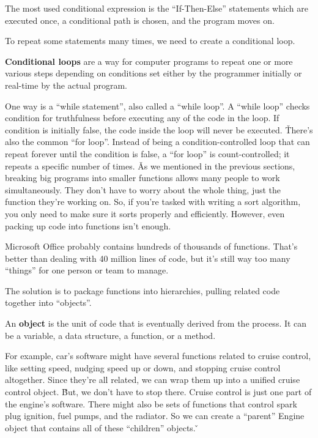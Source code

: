 The most used conditional expression is the ``If-Then-Else'' statements which are executed once, a conditional path
is chosen, and the program moves on.


To repeat some statements many times, we need to create a conditional loop.

\textbf{Conditional loops} are a way for computer programs to repeat one or more various steps depending on
conditions set either by the programmer initially or real-time by the actual program.
\ed

One way is a ``while statement'', also called a ``while loop''. A ``while loop'' checks condition for truthfulness
before executing any of the code in the loop. If condition is initially false, the code inside the loop will never be
executed. \v

There's also the common ``for loop''. Instead of being a condition-controlled loop that can repeat forever until the
condition is false, a ``for loop'' is count-controlled; it repeats a specific number of times. \v

As we mentioned in the previous sections, breaking big programs into smaller functions allows many people to work
simultaneously. They don't have to worry about the whole thing, just the function they're working on. So,  if you're
tasked with writing a sort algorithm, you only need to make sure it sorts properly and efficiently. However, even
packing up code into functions isn't enough.

\be
Microsoft Office probably contains hundreds of thousands of functions. That's better than dealing with 40 million
lines of code, but it's still way too many ``things'' for one person or team to manage.
\ee

The solution is to package functions into hierarchies, pulling related code together into ``objects''.

\bd[Object]
An \textbf{object} is the unit of code that is eventually derived from the process. It can be a variable, a data
structure, a function, or a method.
\ed

\be
For example, car's software might have several functions related to cruise control, like setting speed, nudging speed
up or down, and stopping cruise control altogether. Since they're all related, we can wrap them up into a unified
cruise control object. \v

But, we don't have to stop there. Cruise control is just one part of the engine's software. There might also be sets
of functions that control spark plug ignition, fuel pumps, and the radiator. So we can create a ``parent'' Engine
object that contains all of these ``children'' objects. \v

